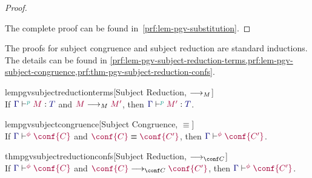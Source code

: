 \documentclass[main.tex]{subfiles}
\begin{document}
\begin{compacttheorems}
\begin{proof}
\begin{case*}
      \begin{mathpar}
        \small
      \end{mathpar}
    \end{case*}
    The complete proof can be found in~\cref{prf:lem-pgv-substitution}.
  \end{proof}
\end{compacttheorems}
The proofs for subject congruence and subject reduction are standard inductions. The details can be found in \cref{prf:lem-pgv-subject-reduction-terms,prf:lem-pgv-subject-congruence,prf:thm-pgv-subject-reduction-confs}.
\begin{compacttheorems}
  \begin{restatablelemma}{lempgvsubjectreductionterms}[Subject Reduction, $\tred$]
    \label{lem:pgv-subject-reduction-terms}
    \hfill\\%
    If $\tseq[\cs{p}]{\ty{\Gamma}}{M}{T}$ and $\tm{M}\tred\tm{M'}$,
    then $\tseq[\cs{p}]{\ty{\Gamma}}{M'}{T}$.
  \end{restatablelemma}
  \begin{restatablelemma}{lempgvsubjectcongruence}[Subject Congruence, $\equiv$]
    \label{lem:pgv-subject-congruence}
    \hfill\\%
    If $\cseq[\phi]{\ty{\Gamma}}{\conf{C}}$ and $\tm{\conf{C}}\equiv\tm{\conf{C'}}$,
    then $\cseq[\phi]{\ty{\Gamma}}{\conf{C'}}$.
  \end{restatablelemma}
  \begin{restatabletheorem}{thmpgvsubjectreductionconfs}[Subject Reduction, $\cred$]
    \label{thm:pgv-subject-reduction-confs}
    \hfill\\%
    If $\cseq[\phi]{\ty{\Gamma}}{\conf{C}}$ and $\tm{\conf{C}}\cred\tm{\conf{C'}}$,
    then $\cseq[\phi]{\ty{\Gamma}}{\conf{C'}}$.
  \end{restatabletheorem}
\end{compacttheorems}
\end{document}
